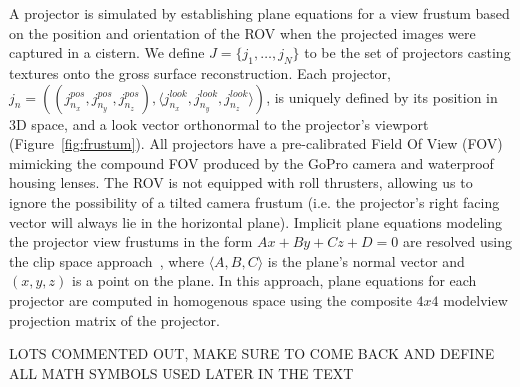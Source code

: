 \documentclass[twocolumn]{article}
\begin{document}
A projector is simulated by establishing plane equations for a view frustum based on the position and orientation of the ROV when the projected images were captured in a cistern. We define $J = \{j_{1},\dots,j_{N}\}$ to be the set of projectors casting textures onto the gross surface reconstruction. Each projector, $j_{n} = ((j_{n_{x}}^{pos},j_{n_{y}}^{pos},j_{n_{z}}^{pos}), \langle j_{n_{x}}^{look},j_{n_{y}}^{look},j_{n_{z}}^{look}\rangle)$, is uniquely defined by its position in 3D space, and a look vector orthonormal to the projector's viewport (Figure~\ref{fig:frustum}). All projectors have a pre-calibrated Field Of View (FOV) mimicking the compound FOV produced by the GoPro camera and waterproof housing lenses. The ROV is not equipped with roll thrusters, allowing us to ignore the possibility of a tilted camera frustum (i.e. the projector's right facing vector will always lie in the horizontal plane). Implicit plane equations modeling the projector view frustums in the form $Ax + By + Cz + D = 0$ are resolved using the clip space approach~\cite{vfc}, where $\langle A, B, C\rangle$ is the plane's normal vector and  $(x, y, z)$ is a point on the plane. In this approach, plane equations for each projector are computed in homogenous space using the composite $4x4$ modelview projection matrix of the projector.

LOTS COMMENTED OUT, MAKE SURE TO COME BACK AND DEFINE ALL MATH SYMBOLS USED LATER IN THE TEXT
\end{document}
